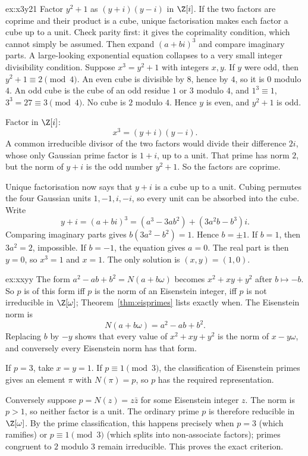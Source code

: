 \begin{solution}{ex:x3y21}
\idea Factor $y^2+1$ as $(y+i)(y-i)$ in $\Z[i]$. If the two factors are coprime and their product is a cube, unique factorisation makes each factor a cube up to a unit. Check parity first: it gives the coprimality condition, which cannot simply be assumed. Then expand $(a+bi)^3$ and compare imaginary parts. A large-looking exponential equation collapses to a very small integer divisibility condition.
\writeup Suppose $x^3=y^2+1$ with integers $x,y$. If $y$ were odd, then $y^2+1\equiv2\pmod4$. An even cube is divisible by $8$, hence by $4$, so it is $0$ modulo $4$. An odd cube is the cube of an odd residue $1$ or $3$ modulo $4$, and $1^3\equiv1$, $3^3=27\equiv3\pmod4$. No cube is $2$ modulo $4$. Hence $y$ is even, and $y^2+1$ is odd.

Factor in $\Z[i]$:
\[
x^3=(y+i)(y-i).
\]
A common irreducible divisor of the two factors would divide their difference $2i$, whose only Gaussian prime factor is $1+i$, up to a unit. That prime has norm $2$, but the norm of $y+i$ is the odd number $y^2+1$. So the factors are coprime.

Unique factorisation now says that $y+i$ is a cube up to a unit. Cubing permutes the four Gaussian units $1,-1,i,-i$, so every unit can be absorbed into the cube. Write
\[
y+i=(a+bi)^3
=(a^3-3ab^2)+(3a^2b-b^3)i.
\]
Comparing imaginary parts gives
$b(3a^2-b^2)=1$. Hence $b=\pm1$. If $b=1$, then $3a^2=2$, impossible. If $b=-1$, the equation gives $a=0$. The real part is then $y=0$, so $x^3=1$ and $x=1$. The only solution is $(x,y)=(1,0)$.
\end{solution}

\begin{solution}{ex:xxyy}
\idea The form $a^2-ab+b^2=N(a+b\omega)$ becomes $x^2+xy+y^2$ after $b\mapsto-b$. So $p$ is of this form iff $p$ is the norm of an Eisenstein integer, iff $p$ is not irreducible in $\Z[\omega]$; Theorem~\ref{thm:eisprimes} lists exactly when.
\writeup The Eisenstein norm is
\[
N(a+b\omega)=a^2-ab+b^2.
\]
Replacing $b$ by $-y$ shows that every value of $x^2+xy+y^2$ is the norm of $x-y\omega$, and conversely every Eisenstein norm has that form.

If $p=3$, take $x=y=1$. If $p\equiv1\pmod3$, the classification of Eisenstein primes gives an element $\pi$ with $N(\pi)=p$, so $p$ has the required representation.

Conversely suppose $p=N(z)=z\bar z$ for some Eisenstein integer $z$. The norm is $p>1$, so neither factor is a unit. The ordinary prime $p$ is therefore reducible in $\Z[\omega]$. By the prime classification, this happens precisely when $p=3$ (which ramifies) or $p\equiv1\pmod3$ (which splits into non-associate factors); primes congruent to $2$ modulo $3$ remain irreducible. This proves the exact criterion.
\end{solution}

